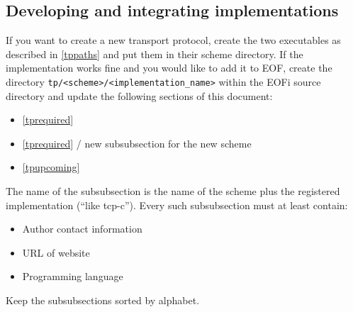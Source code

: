 \subsection{Developing and integrating implementations}
If you want to create a new transport protocol, create the two
executables as described in \ref{tppaths} and put them in their
scheme directory.
If the implementation works fine and you would like to add it to EOF,
create the directory \verb=tp/<scheme>/<implementation_name>= within
the EOFi source directory and update the following
sections of this document:
\begin{itemize}
\item \ref{tprequired}
\item \ref{tprequired} / new subsubsection for the new scheme
\item \ref{tpupcoming}
\end{itemize}

The name of the subsubsection is the name of the scheme
plus the registered implementation ("`like tcp-c"').
Every such subsubsection must at least contain:
\begin{itemize}
\item Author contact information
\item URL of website
\item Programming language
\end{itemize}
Keep the subsubsections sorted by alphabet.

